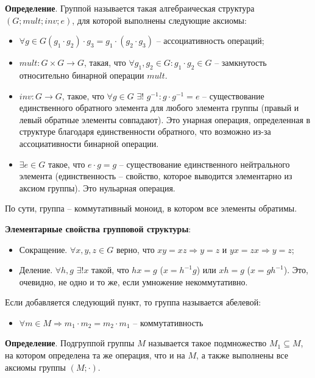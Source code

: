 \documentclass[a4paper]{book}
\begin{document}
\textbf{Определение}. Группой называется такая алгебраическая структура $(G;mult; inv; e)$, для которой выполнены следующие аксиомы:
\begin{itemize}
	\item $\forall g\in G (g_1\cdot g_2)\cdot g_3 = g_1\cdot(g_2\cdot g_3) $ -- ассоциативность операций;
	\item $mult: G\times G\rightarrow G$, такая, что $\forall g_1,g_2\in G: g_1\cdot g_2\in G $ -- замкнутость относительно бинарной операции $mult$. 
	\item $inv: G\rightarrow G$, такое, что $\forall g\in G$ $\exists!$ $g^{-1}: g\cdot g^{-1} = e $ -- существование единственного обратного элемента для любого элемента группы (правый и левый обратные элементы совпадают). Это унарная операция, определенная в структуре благодаря единственности обратного, что возможно из-за ассоциативности бинарной операции. 
	\item $\exists e\in G$ такое, что $e\cdot g = g $ -- существование единственного нейтрального элемента (единственность -- свойство, которое выводится элементарно из аксиом группы). Это нульарная операция. 

\end{itemize}

По сути, группа – коммутативный моноид, в котором все элементы обратимы. 

\vspace{\baselineskip}

\textbf{Элементарные свойства групповой структуры}: 
\begin{itemize}
	\item Сокращение. $\forall x,y,z\in G$ верно, что $xy = xz \Rightarrow y = z$ и $yx = zx \Rightarrow y = z$; 
	\item Деление. $\forall h,g$ $\exists ! x$ такой, что $hx = g$ ($x=h^{-1}g$) или $xh = g$ ($x=gh^{-1}$). Это, очевидно, не одно и то же, если умножение некоммутативно. 
\end{itemize}

Если добавляется следующий пункт, то группа называется абелевой: 
\begin{itemize}
	\item $ \forall m\in M \Rightarrow m_1\cdot m_2 = m_2\cdot m_1 $ -- коммутативность
\end{itemize}

\textbf{Определение}. Подгруппой группы $M$ называется такое подмножество $M_1\subseteq M$, на котором определена та же операция, что и на $M$, а также выполнены все аксиомы группы $(M;\cdot)$. 
\end{document}
